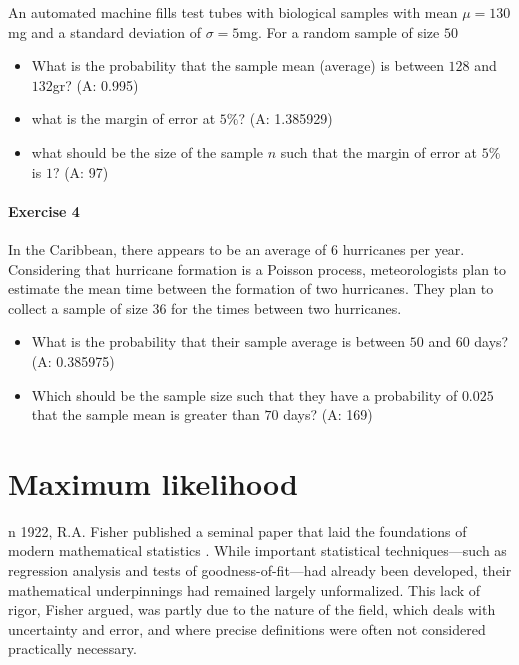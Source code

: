 \documentclass[
]{book}
\begin{document}
An automated machine fills test tubes with biological samples with mean \(\mu=130\)mg and a standard deviation of \(\sigma=5\)mg. For a random sample of size \(50\)

\begin{itemize}
\item
  What is the probability that
  the sample mean (average) is between \(128\) and \(132\)gr? (A: 0.995)
\item
  what is the margin of error at \(5\%\)? (A: 1.385929)
\item
  what should be the size of the sample \(n\) such that the margin of error at \(5\%\) is \(1\)?
  (A: 97)
\end{itemize}

\hypertarget{exercise-4-5}{%
\subsubsection{Exercise 4}\label{exercise-4-5}}

In the Caribbean, there appears to be an average of \(6\) hurricanes per year. Considering that hurricane formation is a Poisson process, meteorologists plan to estimate the mean time between the formation of two hurricanes. They plan to collect a sample of size \(36\) for the times between two hurricanes.

\begin{itemize}
\item
  What is the probability that their sample average is between \(50\) and \(60\) days? (A: 0.385975)
\item
  Which should be the sample size such that they have a probability of \(0.025\) that the sample mean is greater than \(70\) days? (A: 169)
\end{itemize}

\hypertarget{maximum-likelihood}{%
\chapter{Maximum likelihood}\label{maximum-likelihood}}

n 1922, R.A. Fisher published a seminal paper that laid the foundations of modern mathematical statistics \citep{Fisher1922}. While important statistical techniques---such as regression analysis and tests of goodness-of-fit---had already been developed, their mathematical underpinnings had remained largely unformalized. This lack of rigor, Fisher argued, was partly due to the nature of the field, which deals with uncertainty and error, and where precise definitions were often not considered practically necessary.
\end{document}
